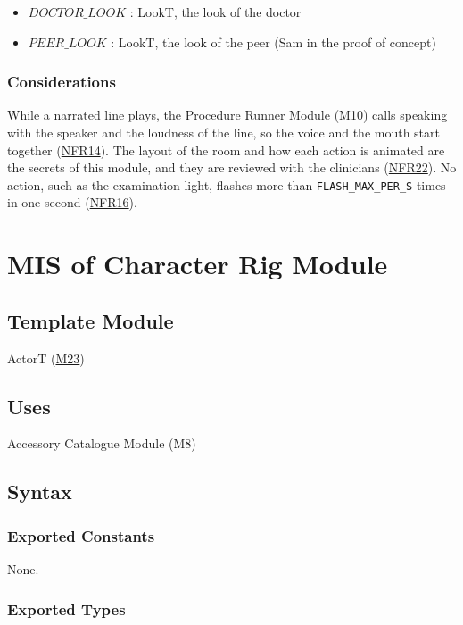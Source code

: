 \documentclass[10pt, titlepage]{article}
\newcommand{\srsurl}{https://team-hindsight.github.io/ophthamology-game/SRS/SRS.pdf}
\newcommand{\srsitemref}[2]{\href{\srsurl\#nameddest=#1}{#2}}
\newcommand{\misref}[2]{\hyperref[mis:#1]{M#2}}
\newcommand{\T}[1]{\mathit{#1}}          %
\begin{document}
\begin{itemize}
\item $\T{DOCTOR\_LOOK}$ : LookT, the look of the doctor
\item $\T{PEER\_LOOK}$ : LookT, the look of the peer (Sam in the proof of
  concept)
\end{itemize}

\subsubsection{Considerations}

While a narrated line plays, the Procedure Runner Module (M10) calls speaking
with the speaker and the loudness of the line, so the voice and the mouth start
together (\srsitemref{NFR_AVSync}{NFR14}). The layout of the room and how each
action is animated are the secrets of this module, and they are reviewed with
the clinicians (\srsitemref{NFR_ClinicalAccuracy}{NFR22}). No action, such as
the examination light, flashes more than \texttt{FLASH\_MAX\_PER\_S} times in
one second (\srsitemref{NFR_Flashing}{NFR16}).

\newpage
\section{MIS of Character Rig Module} \label{mis:Rig}

\subsection{Template Module}

ActorT (\misref{Rig}{23})

\subsection{Uses}

Accessory Catalogue Module (M8)

\subsection{Syntax}

\subsubsection{Exported Constants}

None.

\subsubsection{Exported Types}
\end{document}
